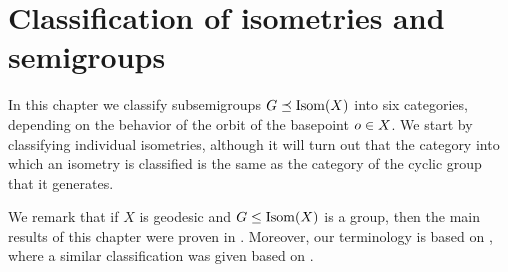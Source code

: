 
\draftnewpage
\chapter{Classification of isometries and semigroups} \label{sectionclassification}

In this chapter we classify subsemigroups $G\preceq\operatorname{Isom}(X)$ into six categories, depending on the behavior of the orbit of the basepoint $o\in X$. We start by classifying individual isometries, although it will turn out that the category into which an isometry is classified is the same as the category of the cyclic group that it generates.

We remark that if $X$ is geodesic and $G\leq\operatorname{Isom}(X)$ is a group, then the main results of this chapter were proven in \cite{Hamann}. Moreover, our terminology is based on \cite[\63.A]{CCMT}, where a similar classification was given based on \cite[]{Gromov3}.%

\bigskip
